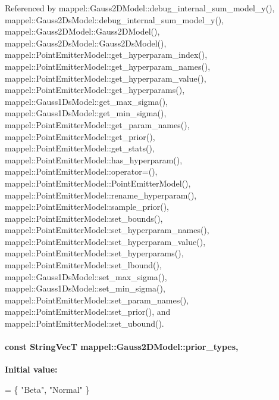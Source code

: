 Referenced by mappel\+::\+Gauss2\+D\+Model\+::debug\+\_\+internal\+\_\+sum\+\_\+model\+\_\+y(), mappel\+::\+Gauss2\+Ds\+Model\+::debug\+\_\+internal\+\_\+sum\+\_\+model\+\_\+y(), mappel\+::\+Gauss2\+D\+Model\+::\+Gauss2\+D\+Model(), mappel\+::\+Gauss2\+Ds\+Model\+::\+Gauss2\+Ds\+Model(), mappel\+::\+Point\+Emitter\+Model\+::get\+\_\+hyperparam\+\_\+index(), mappel\+::\+Point\+Emitter\+Model\+::get\+\_\+hyperparam\+\_\+names(), mappel\+::\+Point\+Emitter\+Model\+::get\+\_\+hyperparam\+\_\+value(), mappel\+::\+Point\+Emitter\+Model\+::get\+\_\+hyperparams(), mappel\+::\+Gauss1\+Ds\+Model\+::get\+\_\+max\+\_\+sigma(), mappel\+::\+Gauss1\+Ds\+Model\+::get\+\_\+min\+\_\+sigma(), mappel\+::\+Point\+Emitter\+Model\+::get\+\_\+param\+\_\+names(), mappel\+::\+Point\+Emitter\+Model\+::get\+\_\+prior(), mappel\+::\+Point\+Emitter\+Model\+::get\+\_\+stats(), mappel\+::\+Point\+Emitter\+Model\+::has\+\_\+hyperparam(), mappel\+::\+Point\+Emitter\+Model\+::operator=(), mappel\+::\+Point\+Emitter\+Model\+::\+Point\+Emitter\+Model(), mappel\+::\+Point\+Emitter\+Model\+::rename\+\_\+hyperparam(), mappel\+::\+Point\+Emitter\+Model\+::sample\+\_\+prior(), mappel\+::\+Point\+Emitter\+Model\+::set\+\_\+bounds(), mappel\+::\+Point\+Emitter\+Model\+::set\+\_\+hyperparam\+\_\+names(), mappel\+::\+Point\+Emitter\+Model\+::set\+\_\+hyperparam\+\_\+value(), mappel\+::\+Point\+Emitter\+Model\+::set\+\_\+hyperparams(), mappel\+::\+Point\+Emitter\+Model\+::set\+\_\+lbound(), mappel\+::\+Gauss1\+Ds\+Model\+::set\+\_\+max\+\_\+sigma(), mappel\+::\+Gauss1\+Ds\+Model\+::set\+\_\+min\+\_\+sigma(), mappel\+::\+Point\+Emitter\+Model\+::set\+\_\+param\+\_\+names(), mappel\+::\+Point\+Emitter\+Model\+::set\+\_\+prior(), and mappel\+::\+Point\+Emitter\+Model\+::set\+\_\+ubound().

\paragraph[{\texorpdfstring{prior\+\_\+types}{prior_types}}]{\setlength{\rightskip}{0pt plus 5cm}const {\bf String\+VecT} mappel\+::\+Gauss2\+D\+Model\+::prior\+\_\+types\hspace{0.3cm}{\ttfamily [static]}, {\ttfamily [inherited]}}\hypertarget{classmappel_1_1Gauss2DModel_a3bd9cb65f8d41f7b7707e3c4e1299dc2}{}\label{classmappel_1_1Gauss2DModel_a3bd9cb65f8d41f7b7707e3c4e1299dc2}
{\bfseries Initial value\+:}
\begin{DoxyCode}
= \{ \textcolor{stringliteral}{"Beta"}, 
                                                       \textcolor{stringliteral}{"Normal"}  
                                                      \}
\end{DoxyCode}


